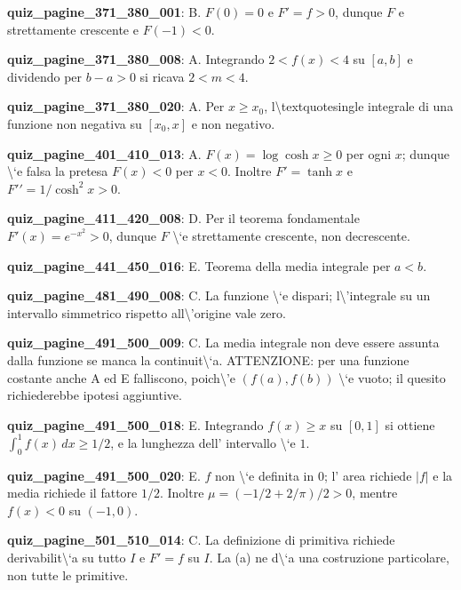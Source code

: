 \documentclass[11pt,a4paper]{article}
\newcounter{quiz}
\begin{document}
\noindent\textbf{quiz\_pagine\_371\_380\_001}: B. $F(0)=0$ e $F\prime=f>0$, dunque $F$ e strettamente crescente e $F(-1)<0$.\par\medskip
\noindent\textbf{quiz\_pagine\_371\_380\_008}: A. Integrando $2<f(x)<4$ su $[a,b]$ e dividendo per $b-a>0$ si ricava $2<m<4$.\par\medskip
\noindent\textbf{quiz\_pagine\_371\_380\_020}: A. Per $x\geq x_0$, l\textbackslash{}textquotesingle integrale di una funzione non negativa su $[x_0,x]$ e non negativo.\par\medskip
\noindent\textbf{quiz\_pagine\_401\_410\_013}: A. $F(x)=\log\cosh x\geq0$ per ogni $x$; dunque \textbackslash{}`e falsa la pretesa $F(x)<0$ per $x<0$. Inoltre $F\prime=\tanh x$ e $F\prime\prime=1/\cosh^2x>0$.\par\medskip
\noindent\textbf{quiz\_pagine\_411\_420\_008}: D. Per il teorema fondamentale $F\prime(x)=e^{-x^2}>0$, dunque $F$ \textbackslash{}`e strettamente crescente, non decrescente.\par\medskip
\noindent\textbf{quiz\_pagine\_441\_450\_016}: E. Teorema della media integrale per $a<b$.\par\medskip
\noindent\textbf{quiz\_pagine\_481\_490\_008}: C. La funzione \textbackslash{}`e dispari; l\textbackslash{}'integrale su un intervallo simmetrico rispetto all\textbackslash{}'origine vale zero.\par\medskip
\noindent\textbf{quiz\_pagine\_491\_500\_009}: C. La media integrale non deve essere assunta dalla funzione se manca la continuit\textbackslash{}`a. ATTENZIONE: per una funzione costante anche A ed E falliscono, poich\textbackslash{}'e $(f(a),f(b))$ \textbackslash{}`e vuoto; il quesito richiederebbe ipotesi aggiuntive.\par\medskip
\noindent\textbf{quiz\_pagine\_491\_500\_018}: E. Integrando $f(x)\ge x$ su $[0,1]$ si ottiene $\int_0^1f(x)\,dx\ge1/2$, e la lunghezza dell' intervallo \textbackslash{}`e $1$.\par\medskip
\noindent\textbf{quiz\_pagine\_491\_500\_020}: E. $f$ non \textbackslash{}`e definita in $0$; l' area richiede $|f|$ e la media richiede il fattore $1/2$. Inoltre $\mu=(-1/2+2/\pi)/2>0$, mentre $f(x)<0$ su $(-1,0)$.\par\medskip
\noindent\textbf{quiz\_pagine\_501\_510\_014}: C. La definizione di primitiva richiede derivabilit\textbackslash{}`a su tutto $I$ e $F\prime=f$ su $I$. La (a) ne d\textbackslash{}`a una costruzione particolare, non tutte le primitive.\par\medskip
\end{document}
